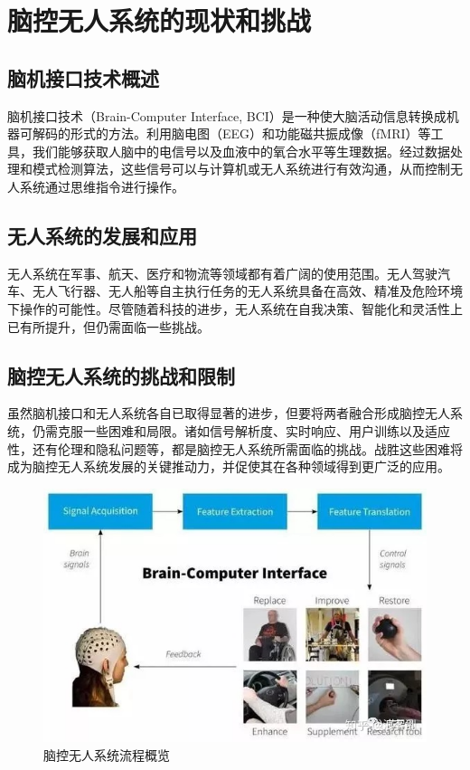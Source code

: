 \documentclass{thuemp}
\begin{document}
\section{脑控无人系统的现状和挑战}
\subsection{脑机接口技术概述}
脑机接口技术（Brain-Computer Interface, BCI）是一种使大脑活动信息转换成机器可解码的形式的方法。利用脑电图（EEG）和功能磁共振成像（fMRI）等工具，我们能够获取人脑中的电信号以及血液中的氧合水平等生理数据。经过数据处理和模式检测算法，这些信号可以与计算机或无人系统进行有效沟通，从而控制无人系统通过思维指令进行操作。

\subsection{无人系统的发展和应用}
无人系统在军事、航天、医疗和物流等领域都有着广阔的使用范围。无人驾驶汽车、无人飞行器、无人船等自主执行任务的无人系统具备在高效、精准及危险环境下操作的可能性。尽管随着科技的进步，无人系统在自我决策、智能化和灵活性上已有所提升，但仍需面临一些挑战。

\subsection{脑控无人系统的挑战和限制}
虽然脑机接口和无人系统各自已取得显著的进步，但要将两者融合形成脑控无人系统，仍需克服一些困难和局限。诸如信号解析度、实时响应、用户训练以及适应性，还有伦理和隐私问题等，都是脑控无人系统所需面临的挑战。战胜这些困难将成为脑控无人系统发展的关键推动力，并促使其在各种领域得到更广泛的应用。

\begin{figure}[h]
	\centering
    \includegraphics[width=0.8\linewidth]{./img/njjk-lch.jpg}
    \caption{脑控无人系统流程概览}
\end{figure}
\end{document}
